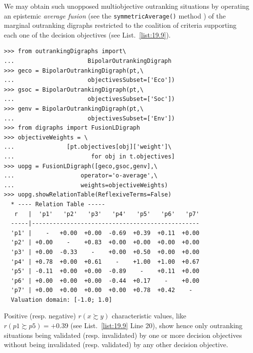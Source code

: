We may obtain such unopposed multiobjective outranking situations by operating an epistemic \emph{average fusion} (see the \texttt{symmetricAverage()} method ) of the marginal outranking digraphs restricted to the coalition of criteria supporting each one of the decision objectives (see List.~\vref{list:19.9}).
\begin{lstlisting}[caption={Computing unopposed outranking situations},label=list:19.9]
>>> from outrankingDigraphs import\
...                     BipolarOutrankingDigraph
>>> geco = BipolarOutrankingDigraph(pt,\
...                     objectivesSubset=['Eco'])
>>> gsoc = BipolarOutrankingDigraph(pt,\
...                     objectivesSubset=['Soc'])
>>> genv = BipolarOutrankingDigraph(pt,\
...                     objectivesSubset=['Env'])
>>> from digraphs import FusionLDigraph
>>> objectiveWeights = \
...               [pt.objectives[obj]['weight']\
...                      for obj in t.objectives] 
>>> uopg = FusionLDigraph([geco,gsoc,genv],\
...                   operator='o-average',\
...                   weights=objectiveWeights)
>>> uopg.showRelationTable(ReflexiveTerms=False)
  * ---- Relation Table -----
   r   |  'p1'   'p2'   'p3'   'p4'   'p5'   'p6'   'p7'   
  -----|------------------------------------------------
  'p1' |    -   +0.00  +0.00  -0.69  +0.39  +0.11  +0.00  
  'p2' | +0.00    -    +0.83  +0.00  +0.00  +0.00  +0.00  
  'p3' | +0.00  -0.33    -    +0.00  +0.50  +0.00  +0.00  
  'p4' | +0.78  +0.00  +0.61    -    +1.00  +1.00  +0.67  
  'p5' | -0.11  +0.00  +0.00  -0.89    -    +0.11  +0.00  
  'p6' | +0.00  +0.00  +0.00  -0.44  +0.17    -    +0.00  
  'p7' | +0.00  +0.00  +0.00  +0.00  +0.78  +0.42    -   
  Valuation domain: [-1.0; 1.0]
\end{lstlisting}
Positive (resp. negative) $r(x \succsim y)$ characteristic values, like $r(p1 \succsim p5) = +0.39$ (see List.~\vref{list:19.9} Line 20), show hence only outranking situations being validated (resp. invalidated) by one or more decision objectives without being invalidated (resp. validated) by any other decision objective.

